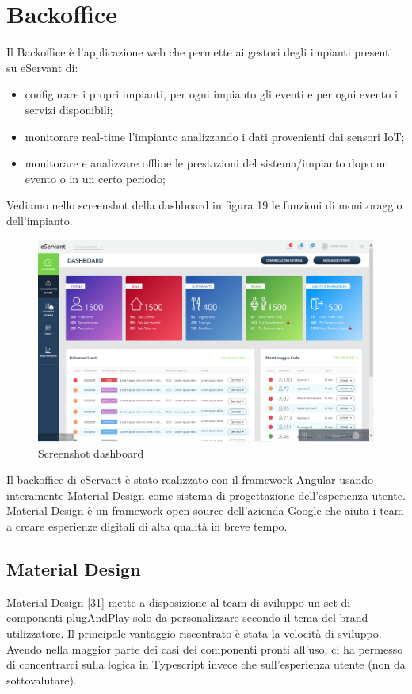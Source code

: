 \chapter{Backoffice}
Il Backoffice è l'applicazione web che permette ai gestori degli impianti presenti su eServant di:
\begin{itemize}
    \item configurare i propri impianti, per ogni impianto gli eventi e per ogni evento i servizi disponibili;
    \item monitorare real-time l'impianto analizzando i dati provenienti dai sensori IoT;
    \item monitorare e analizzare offline le prestazioni del sistema/impianto dopo un evento o in un certo periodo;
\end{itemize}
Vediamo nello screenshot della dashboard in figura 19 le funzioni di monitoraggio dell'impianto.
\begin{figure}[H]
    \centering  
    \caption{Screenshot dashboard}
    \includegraphics[scale=0.4]{img/cap3/backoffice}
\end{figure}

Il backoffice di eServant è stato realizzato con il framework Angular usando interamente Material Design come
sistema di progettazione dell'esperienza utente.
Material Design è un framework open source dell'azienda Google che aiuta i team a creare esperienze digitali
di alta qualità in breve tempo.

\section{Material Design}
Material Design [31] mette a disposizione al team di sviluppo un set di componenti plugAndPlay solo da personalizzare
secondo il tema del brand utilizzatore.
Il principale vantaggio riscontrato è stata la velocità di sviluppo. Avendo nella maggior parte dei
casi dei componenti pronti all'uso, ci ha permesso di concentrarci sulla logica in Typescript invece che
sull'esperienza utente (non da sottovalutare).\\

